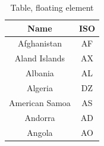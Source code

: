 \documentclass{article}
\begin{document}
\begin{multicols}{2}
\begin{table}
\centering
\begin{tabular}{|c|c|}
\hline
Name & ISO \\
\hline
Afghanistan & AF \\
Aland Islands & AX \\
Albania    &AL  \\
Algeria   &DZ \\
American Samoa & AS \\
Andorra & AD   \\
Angola & AO \\
\hline
\end{tabular}
\caption{Table, floating element}
\label{table:ta}
\end{table}
\blindtext
\end{multicols}
\end{document}
